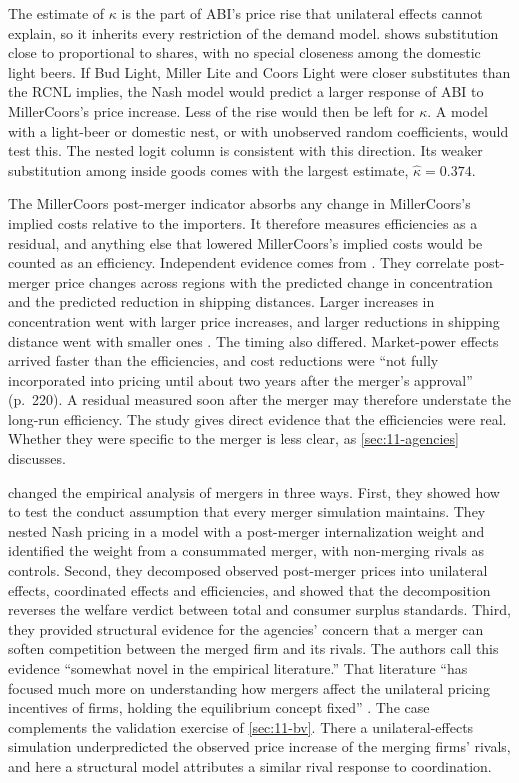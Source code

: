 The estimate of $\kappa$ is the part of ABI's price rise that unilateral effects cannot explain, so it inherits every
restriction of the demand model.  shows substitution close to proportional to shares, with no
special closeness among the domestic light beers. If Bud Light, Miller Lite and Coors Light were closer substitutes
than the RCNL implies, the Nash model would predict a larger response of ABI to MillerCoors's price increase. Less of
the rise would then be left for $\kappa$. A model with a light-beer or domestic nest, or with unobserved random
coefficients, would test this. The nested logit column is consistent with this direction. Its weaker
substitution among inside goods comes with the largest estimate, $\hat\kappa = 0.374$.

The MillerCoors post-merger indicator absorbs any change in MillerCoors's implied costs relative to the importers.
It therefore measures efficiencies as a residual, and anything else that lowered MillerCoors's implied costs would
be counted as an efficiency. Independent evidence comes from \citet{AshenfelterHoskenWeinberg2015}. They correlate
post-merger price changes across regions with the predicted change in concentration and the predicted reduction in
shipping distances. Larger increases in concentration went with larger price increases, and larger reductions in
shipping distance went with smaller ones \citep[p.~220]{AskerNocke2021}. The timing also differed. Market-power
effects arrived faster than the efficiencies, and cost reductions were ``not fully incorporated into pricing until
about two years after the merger's approval'' (p.~220). A residual measured soon after the merger may therefore
understate the long-run efficiency. The study gives direct evidence that the efficiencies were real. Whether they
were specific to the merger is less clear, as \cref{sec:11-agencies} discusses.

\citet{MillerWeinberg2017} changed the empirical analysis of mergers in three ways. First, they showed how to test the
conduct assumption that every merger simulation maintains. They nested Nash pricing in a model with a post-merger
internalization weight and identified the weight from a consummated merger, with non-merging rivals as controls. Second, they
decomposed observed post-merger prices into unilateral effects, coordinated effects and efficiencies, and showed
that the decomposition reverses the welfare verdict between total and consumer surplus standards. Third, they provided
structural evidence for the agencies' concern that a merger can soften competition between the merged firm and its
rivals. The authors call this evidence ``somewhat novel in the empirical literature.'' That literature ``has focused
much more on understanding how mergers affect the unilateral pricing incentives of firms, holding the equilibrium
concept fixed'' \citep[p.~1788]{MillerWeinberg2017}. The case complements the validation exercise of \cref{sec:11-bv}. There a
unilateral-effects simulation underpredicted the observed price increase of the merging firms' rivals, and here a
structural model attributes a similar rival response to coordination.
